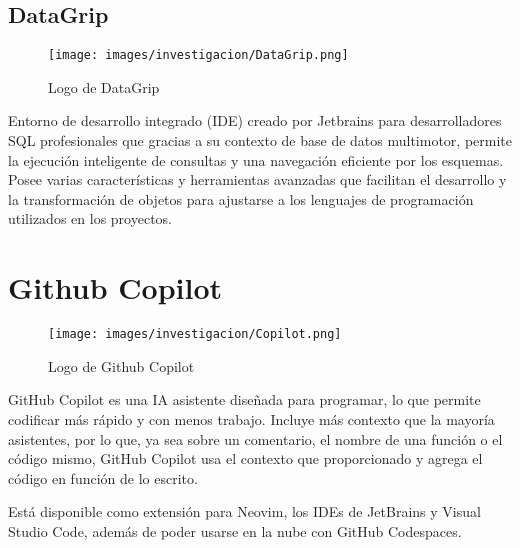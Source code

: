        \subsection{DataGrip}

            \nocite{Jetbrains-DataGrip}

            \begin{figure*}[h]
            \label{figura:datagrip}

                \centering
                \texttt{[image: images/investigacion/DataGrip.png]}
                \caption{Logo de DataGrip}

            \end{figure*}


        Entorno de desarrollo integrado (IDE) creado por Jetbrains para desarrolladores SQL profesionales que gracias a su contexto de base de datos multimotor, permite la ejecución inteligente de consultas y una navegación eficiente por los esquemas. Posee varias características y herramientas avanzadas que facilitan el desarrollo y la transformación de objetos para ajustarse a los lenguajes de programación utilizados en los proyectos.




    \section{Github Copilot}

        \nocite{Copilot}

        \begin{figure*}[h]
        \label{figura:copilot}

            \centering
            \texttt{[image: images/investigacion/Copilot.png]}
            \caption{Logo de Github Copilot}

        \end{figure*}

        GitHub Copilot es una IA asistente diseñada para programar, lo que permite codificar más rápido y con menos trabajo. Incluye más contexto que la mayoría asistentes, por lo que, ya sea sobre un comentario, el nombre de una función o el código mismo, GitHub Copilot usa el contexto que proporcionado y agrega el código en función de lo escrito.

        Está disponible como extensión para Neovim, los IDEs de JetBrains y Visual Studio Code, además de poder usarse en la nube con GitHub Codespaces.




